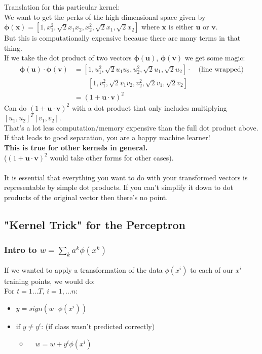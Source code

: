 Translation for this particular kernel: \hfill \\
We want to get the perks of the high dimensional space given by $\bm{\phi}(\bm{x}) = [1, x_1^2, \sqrt{2}x_1 x_2, x_2^2, \sqrt{2} x_1, \sqrt{2} x_2]$ where $\bm{x}$ is either $\bm{u}$ or $\bm{v}$.  \hfill \\
But this is computationally expensive because there are many terms in that thing.  \hfill \\
If we take the dot product of two vectors $\bm{\phi}(\bm{u})$, $\bm{\phi}(\bm{v})$ we get some magic: \hfill \\
\begin{align*}
	\bm{\phi}(\bm{u}) \cdot \bm{\phi}(\bm{v}) &= [1, u_1^2, \sqrt{2}u_1 u_2, u_2^2, \sqrt{2} u_1, \sqrt{2} u_2]  \cdot \quad \mbox{(line wrapped)} \\
			& \quad \quad [1, v_1^2, \sqrt{2}v_1 v_2, v_2^2, \sqrt{2} v_1, \sqrt{2} v_2]   \\
		&=  (1 + \bm{u} \cdot \bm{v})^2
\end{align*}
Can do $(1 + \bm{u} \cdot \bm{v})^2$ with a dot product that only includes multiplying $[u_1, u_2]^T[v_1, v_2]$.     \hfill \\ 
That's a lot less computation/memory expensive than the full dot product above.  \hfill \\
If that leads to good separation, you are a happy machine learner!   \hfill \\
\textbf{This is true for other kernels in general.}   \hfill \\
($(1 + \bm{u} \cdot \bm{v})^2$ would take other forms for other cases).   \hfill \\
\hfill \\

It is essential that everything you want to do with your transformed vectors is representable by simple dot products.
If you can't simplify it down to dot products of the original vector then there's no point. 

\subsection{"Kernel Trick" for the Perceptron}

\subsubsection{Intro to $ \displaystyle w = \sum_k a^k \phi(x^k)$}
If we wanted to apply a transformation of the data $\phi(x^i)$ to each of our $x^i$ training points, we would do: \hfill \\
For $t = 1 \dots T$, $i = 1, \dots n$:
\begin{itemize}
	\item $ y = sign(w \cdot \phi(x^i))$
	\item if $y \neq y^i$:  (if class wasn't predicted correctly)
	\begin{itemize}
		\item $ \quad w = w + y^i \phi(x^i)$  %
	\end{itemize}
\end{itemize}

